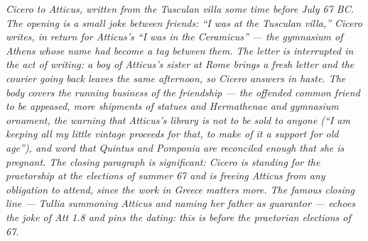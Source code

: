 
\textit{Cicero to Atticus, written from the Tusculan villa
some time before July 67 BC. The opening is a small joke
between friends: ``I was at the Tusculan villa,'' Cicero
writes, in return for Atticus's ``I was in the Ceramicus''
--- the gymnasium of Athens whose name had become a tag
between them. The letter is interrupted in the act of
writing: a boy of Atticus's sister at Rome brings a fresh
letter and the courier going back leaves the same afternoon,
so Cicero answers in haste. The body covers the running
business of the friendship --- the offended common friend
to be appeased, more shipments of statues and Hermathenae
and gymnasium ornament, the warning that Atticus's library
is not to be sold to anyone (``I am keeping all my little
vintage proceeds for that, to make of it a support for old
age''), and word that Quintus and Pomponia are reconciled
enough that she is pregnant. The closing paragraph is
significant: Cicero is standing for the praetorship at the
elections of summer 67 and is freeing Atticus from any
obligation to attend, since the work in Greece matters more.
The famous closing line --- Tullia summoning Atticus and
naming her father as guarantor --- echoes the joke of Att
1.8 and pins the dating: this is before the praetorian
elections of 67.}
